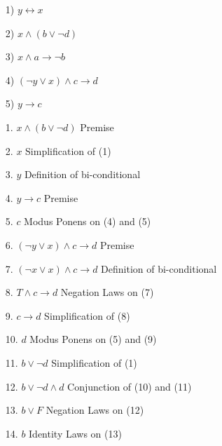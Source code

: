 \begin{enumerate}
    \begin{enumerate}
        \item[1)] $y \leftrightarrow x$
        \item[2)] $x \land (b \lor \lnot d)$
        \item[3)] $x \land a \rightarrow \lnot b$
        \item[4)] $(\lnot y \lor x) \land c \rightarrow d$
        \item[5)] $y \rightarrow c$
    \end{enumerate}
    \begin{solution}
        \begin{enumerate}
            \item[1.] $x \land (b \lor \lnot d)$ \hfill Premise 
            \item[2.] $x$ \hfill Simplification of (1)
            \item[3.] $y$ \hfill Definition of bi-conditional
            \item[4.] $y \rightarrow c$ \hfill Premise
            \item[5.] $c$ \hfill Modus Ponens on (4) and (5)
            \item[6.] $(\lnot y \lor x) \land c \rightarrow d$ \hfill Premise
            \item[7.] $(\lnot x \lor x) \land c \rightarrow d$ \hfill Definition of bi-conditional
            \item[8.] $T \land c \rightarrow d$ \hfill Negation Laws on (7)
            \item[9.] $c \rightarrow d$ \hfill Simplification of (8)
            \item[10.] $d$ \hfill Modus Ponens on (5) and (9)
            \item[11.] $b \lor \lnot d$ \hfill Simplification of (1)
            \item[12.] $b \lor \lnot d \land d$ \hfill Conjunction of (10) and (11)
            \item[13.] $b \lor F$ \hfill Negation Laws on (12)
            \item[14.] $b$ \hfill Identity Laws on (13)
        \end{enumerate}
    \end{solution}




\end{enumerate}
